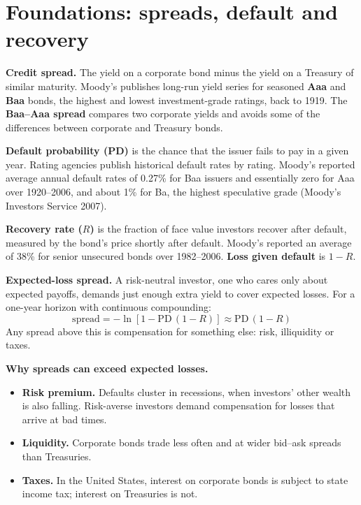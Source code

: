 \section{Foundations: spreads, default and recovery}
\label{sec:17-foundations}

\textbf{Credit spread.} The yield on a corporate bond minus the yield on a Treasury of similar maturity. Moody's publishes long-run yield series for seasoned \textbf{Aaa} and \textbf{Baa} bonds, the highest and lowest investment-grade ratings, back to 1919. The \textbf{Baa--Aaa spread} compares two corporate yields and avoids some of the differences between corporate and Treasury bonds.

\textbf{Default probability (PD)} is the chance that the issuer fails to pay in a given year. Rating agencies publish historical default rates by rating. Moody's reported average annual default rates of 0.27\% for Baa issuers and essentially zero for Aaa over 1920--2006, and about 1\% for Ba, the highest speculative grade (Moody's Investors Service 2007).

\textbf{Recovery rate ($R$)} is the fraction of face value investors recover after default, measured by the bond's price shortly after default. Moody's reported an average of 38\% for senior unsecured bonds over 1982--2006. \textbf{Loss given default} is $1 - R$.

\textbf{Expected-loss spread.} A risk-neutral investor, one who cares only about expected payoffs, demands just enough extra yield to cover expected losses. For a one-year horizon with continuous compounding:
\begin{equation}
  \text{spread} = -\ln\!\left[1 - \mathrm{PD}\,(1 - R)\right] \approx \mathrm{PD}\,(1 - R)
  \label{eq:17-el}
\end{equation}
Any spread above this is compensation for something else: risk, illiquidity or taxes.

\textbf{Why spreads can exceed expected losses.}

\begin{itemize}
  \item \textbf{Risk premium.} Defaults cluster in recessions, when investors' other wealth is also falling. Risk-averse investors demand compensation for losses that arrive at bad times.
  \item \textbf{Liquidity.} Corporate bonds trade less often and at wider bid--ask spreads than Treasuries.
  \item \textbf{Taxes.} In the United States, interest on corporate bonds is subject to state income tax; interest on Treasuries is not.
\end{itemize}

